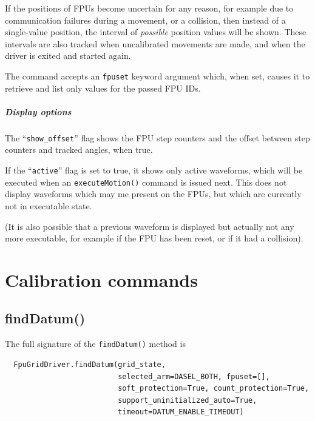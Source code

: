 \documentclass[fontsize=12,a4paper]{scrreprt}
\begin{document}
If the positions of FPUs become uncertain for any reason, for example
due to communication failures during a movement, or a collision, then
instead of a single-value position, the interval of \emph{possible}
position values will be shown.  These intervals are also tracked when
uncalibrated movements are made, and when the driver is exited and
started again.


The command accepts an \texttt{fpuset} keyword argument which, when
set, causes it to retrieve and list only values for the passed FPU
IDs.

\paragraph{Display options}

The ``\texttt{show\_offset}'' flag shows the FPU step counters and
the offset between step counters and tracked angles, when
true.

If the ``\texttt{active}'' flag is set to true, it shows only active
waveforms, which will be executed when an \texttt{executeMotion()}
command is issued next. This does not display waveforms which may me
present on the FPUs, but which are currently not in executable state.

(It is also possible that a previous waveform is displayed but
actually not any more executable, for example if the FPU has been
reset, or if it had a collision).

\chapter{Calibration commands}

\section{findDatum()}
\label{sec:finddatum}

The full signature of the \texttt{findDatum()} method is

\begin{verbatim}
  FpuGridDriver.findDatum(grid_state,
                          selected_arm=DASEL_BOTH, fpuset=[],
                          soft_protection=True, count_protection=True,
                          support_uninitialized_auto=True,
                          timeout=DATUM_ENABLE_TIMEOUT)
\end{verbatim}
\end{document}

